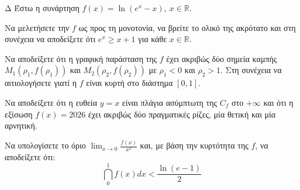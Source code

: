 \begin{thema}{Δ}
Έστω η συνάρτηση $\displaystyle f(x) = \ln(e^x - x), \ x \in \mathbb{R}$.
\begin{erwthma}
    \item Να μελετήσετε την $f$ ως προς τη μονοτονία, να βρείτε το ολικό της ακρότατο και στη συνέχεια να αποδείξετε ότι $e^x \ge x+1$ για κάθε $x \in \mathbb{R}$.
    \item Να αποδείξετε ότι η γραφική παράσταση της $f$ έχει ακριβώς δύο σημεία καμπής $M_1(\rho_1, f(\rho_1))$ και $M_2(\rho_2, f(\rho_2))$ με $\rho_1 < 0$ και $\rho_2 > 1$. Στη συνέχεια να αιτιολογήσετε γιατί η $f$ είναι κυρτή στο διάστημα $[0, 1]$.
    \item Να αποδείξετε ότι η ευθεία $y = x$ είναι πλάγια ασύμπτωτη της $C_f$ στο $+\infty$ και ότι η εξίσωση $f(x) = 2026$ έχει ακριβώς δύο πραγματικές ρίζες, μία θετική και μία αρνητική.
    \item Να υπολογίσετε το όριο $\displaystyle \lim_{x\to 0} \frac{f(x)}{x^2}$ και, με βάση την κυρτότητα της $f$, να αποδείξετε ότι:
    \[ \dint_0^1 f(x) dx < \frac{\ln(e-1)}{2} \]
\end{erwthma}
\end{thema}
